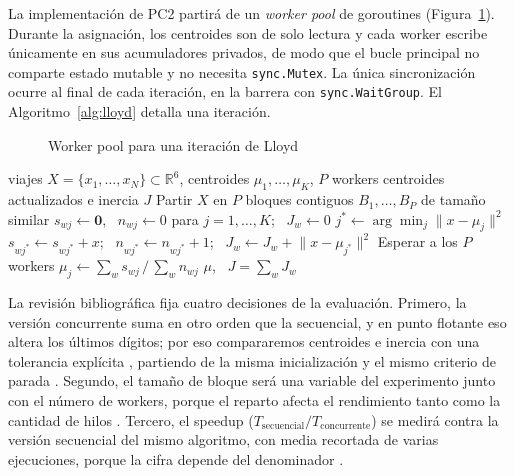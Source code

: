 La implementación de PC2 partirá de un \emph{worker pool} de goroutines
(Figura~\ref{fig:workerpool}). Durante la asignación, los centroides son de solo lectura y cada
worker escribe únicamente en sus acumuladores privados, de modo que el bucle principal no comparte
estado mutable y no necesita \texttt{sync.Mutex}. La única sincronización ocurre al final de cada
iteración, en la barrera con \texttt{sync.WaitGroup}. El Algoritmo~\ref{alg:lloyd} detalla una
iteración.

\begin{figure}[H]
\caption{Worker pool para una iteración de Lloyd}\label{fig:workerpool}
\centering
\small

\end{figure}

\begin{algorithm}[tbp]
\caption{Una iteración de Lloyd con worker pool y acumuladores privados}\label{alg:lloyd}
\begin{algorithmic}[1]
\Require viajes $X = \{x_1, \dots, x_N\} \subset \mathbb{R}^6$, centroides $\mu_1, \dots, \mu_K$,
         $P$ workers
\Ensure centroides actualizados e inercia $J$
\State Partir $X$ en $P$ bloques contiguos $B_1, \dots, B_P$ de tamaño similar
 
  \State $s_{wj} \gets \mathbf{0}$, \ $n_{wj} \gets 0$ para $j = 1, \dots, K$; \ $J_w \gets 0$
    \State $j^{*} \gets \arg\min_j \lVert x - \mu_j \rVert^2$
    \State $s_{wj^{*}} \gets s_{wj^{*}} + x$; \ $n_{wj^{*}} \gets n_{wj^{*}} + 1$;
           \ $J_w \gets J_w + \lVert x - \mu_{j^{*}} \rVert^2$
  \EndFor
\EndFor
\State Esperar a los $P$ workers 
    \State $\mu_j \gets \sum_w s_{wj} \,/\, \sum_w n_{wj}$ 
  \EndIf
\EndFor
\State \Return $\mu$, \ $J = \sum_w J_w$
\end{algorithmic}
\end{algorithm}

La revisión bibliográfica fija cuatro decisiones de la evaluación. Primero, la versión concurrente
suma en otro orden que la secuencial, y en punto flotante eso altera los últimos dígitos; por eso
compararemos centroides e inercia con una tolerancia explícita \parencite{he2022}, partiendo de la
misma inicialización y el mismo criterio de parada \parencite{nigro2022}. Segundo, el tamaño de
bloque será una variable del experimento junto con el número de workers, porque el reparto afecta
el rendimiento tanto como la cantidad de hilos \parencite{kwedlo2021,kwedlo2024}. Tercero, el
speedup ($T_{\text{secuencial}} / T_{\text{concurrente}}$) se medirá contra la versión secuencial
del mismo algoritmo, con media recortada de varias ejecuciones, porque la cifra depende del
denominador \parencite{bellavita2025}.

